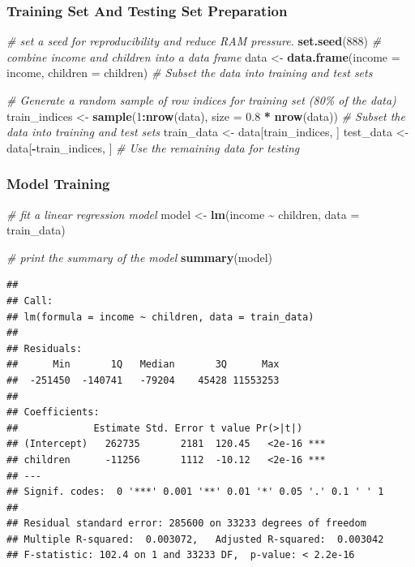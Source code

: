 \documentclass[
]{article}
\newenvironment{Shaded}{\begin{snugshade}}{\end{snugshade}}
\newcommand{\AttributeTok}[1]{\textcolor[rgb]{0.13,0.29,0.53}{#1}}
\newcommand{\CommentTok}[1]{\textcolor[rgb]{0.56,0.35,0.01}{\textit{#1}}}
\newcommand{\DecValTok}[1]{\textcolor[rgb]{0.00,0.00,0.81}{#1}}
\newcommand{\FloatTok}[1]{\textcolor[rgb]{0.00,0.00,0.81}{#1}}
\newcommand{\FunctionTok}[1]{\textcolor[rgb]{0.13,0.29,0.53}{\textbf{#1}}}
\newcommand{\NormalTok}[1]{#1}
\newcommand{\OtherTok}[1]{\textcolor[rgb]{0.56,0.35,0.01}{#1}}
\newcommand{\SpecialCharTok}[1]{\textcolor[rgb]{0.81,0.36,0.00}{\textbf{#1}}}
\begin{document}
\subsubsection{Training Set And Testing Set
Preparation}\label{training-set-and-testing-set-preparation}

\begin{Shaded}
\begin{Highlighting}[]
\CommentTok{\# set a seed for reproducibility and reduce RAM pressure.}
\FunctionTok{set.seed}\NormalTok{(}\DecValTok{888}\NormalTok{)  }
\CommentTok{\# combine income and children into a data frame}
\NormalTok{data }\OtherTok{\textless{}{-}} \FunctionTok{data.frame}\NormalTok{(}\AttributeTok{income =}\NormalTok{ income, }\AttributeTok{children =}\NormalTok{ children)}
\CommentTok{\# Subset the data into training and test sets}

\CommentTok{\# Generate a random sample of row indices for training set (80\% of the data)}
\NormalTok{train\_indices }\OtherTok{\textless{}{-}} \FunctionTok{sample}\NormalTok{(}\DecValTok{1}\SpecialCharTok{:}\FunctionTok{nrow}\NormalTok{(data), }\AttributeTok{size =} \FloatTok{0.8} \SpecialCharTok{*} \FunctionTok{nrow}\NormalTok{(data))}
\CommentTok{\# Subset the data into training and test sets}
\NormalTok{train\_data }\OtherTok{\textless{}{-}}\NormalTok{ data[train\_indices, ]}
\NormalTok{test\_data }\OtherTok{\textless{}{-}}\NormalTok{ data[}\SpecialCharTok{{-}}\NormalTok{train\_indices, ]  }\CommentTok{\# Use the remaining data for testing}
\end{Highlighting}
\end{Shaded}

\subsubsection{Model Training}\label{model-training}

\begin{Shaded}
\begin{Highlighting}[]
\CommentTok{\# fit a linear regression model}
\NormalTok{model }\OtherTok{\textless{}{-}} \FunctionTok{lm}\NormalTok{(income }\SpecialCharTok{\textasciitilde{}}\NormalTok{ children, }\AttributeTok{data =}\NormalTok{ train\_data)}

\CommentTok{\# print the summary of the model}
\FunctionTok{summary}\NormalTok{(model)}
\end{Highlighting}
\end{Shaded}

\begin{verbatim}
## 
## Call:
## lm(formula = income ~ children, data = train_data)
## 
## Residuals:
##      Min       1Q   Median       3Q      Max 
##  -251450  -140741   -79204    45428 11553253 
## 
## Coefficients:
##             Estimate Std. Error t value Pr(>|t|)    
## (Intercept)   262735       2181  120.45   <2e-16 ***
## children      -11256       1112  -10.12   <2e-16 ***
## ---
## Signif. codes:  0 '***' 0.001 '**' 0.01 '*' 0.05 '.' 0.1 ' ' 1
## 
## Residual standard error: 285600 on 33233 degrees of freedom
## Multiple R-squared:  0.003072,   Adjusted R-squared:  0.003042 
## F-statistic: 102.4 on 1 and 33233 DF,  p-value: < 2.2e-16
\end{verbatim}
\end{document}
